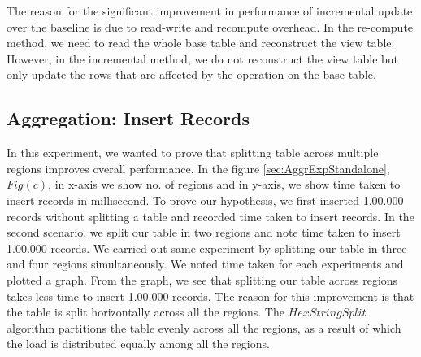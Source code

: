 \documentclass[11pt,a4paper,bibtotoc,idxtotoc,headsepline,footsepline,footexclude,BCOR12mm,DIV13]{scrbook}
\begin{document}
The reason for the significant improvement in performance of incremental update over the baseline is due to read-write and recompute overhead.
In the re-compute method, we need to read the whole base table and
reconstruct the view table. However, in the incremental method, we do not reconstruct the view table but only update the rows that are affected by the operation on the base table. 

\subsection{Aggregation: Insert Records}
\label{Insert Records Aggr}

In this experiment, we wanted to prove that splitting table across multiple regions improves overall performance. In the figure \ref{sec:AggrExpStandalone}, $Fig(c)$, in x-axis we show no. of regions and in y-axis, we show time taken to insert records in millisecond. To prove our hypothesis, we first inserted 1.00.000 records without splitting a table and recorded time taken to insert records. In the second scenario, we split our table in two regions and note time taken to insert 1.00.000 records. We carried out same experiment by splitting our table in three and four regions simultaneously. We noted time taken for each experiments and plotted a graph. From the graph, we see that splitting our table across regions takes less time to insert 1.00.000 records. The reason for this improvement is that the table is split horizontally across all the regions. The $HexStringSplit$ algorithm partitions the table evenly across all the regions, as a result of which the load is distributed equally among all the regions.


\end{document}
